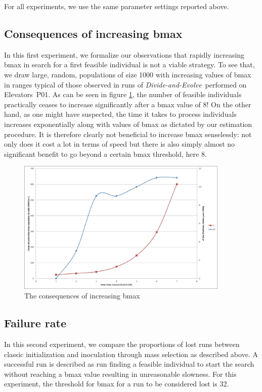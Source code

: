 \documentclass[english]{DESCARWINreport}
\newcommand{\dae}{{\em Divide-and-Evolve}}
\newcommand{\ELEVATORS}{{\sc Elevators}}
\begin{document}
For all experiments, we use the same parameter settings reported above.

\subsection{Consequences of increasing bmax}

In this first experiment, we formalize our observations that rapidly increasing bmax in search for a first feasible individual is not a viable strategy. To see that, we draw large, random, populations of size 1000 with increasing values of bmax in ranges typical of those observed in runs of \dae\  performed on \ELEVATORS\ P01. As can be seen in figure \ref{fig:bmax}, the number of feasible individuals practically ceases to increase significantly after a bmax value of 8! On the other hand, as one might have suspected, the time it takes to process individuals increases exponentially along with values of bmax as dictated by our estimation procedure. It is therefore clearly not beneficial to increase bmax senselessly: not only does it cost a lot in terms of speed but there is also simply almost no significant benefit to go beyond a certain bmax threshold, here 8.

\begin{figure}
	\centering
		\includegraphics[width=0.9\textwidth]{pics/bmax.eps}
	\caption{The consequences of increasing bmax}
	\label{fig:bmax}
\end{figure}

\subsection{Failure rate}

In this second experiment, we compare the proportions of lost runs between classic initialization and inoculation through mass selection as described above. A successful run is described as run finding a feasible individual to start the search without reaching a bmax value resulting in unreasonable slowness. For this experiment, the threshold for bmax for a run to be considered lost is 32.
\end{document}
